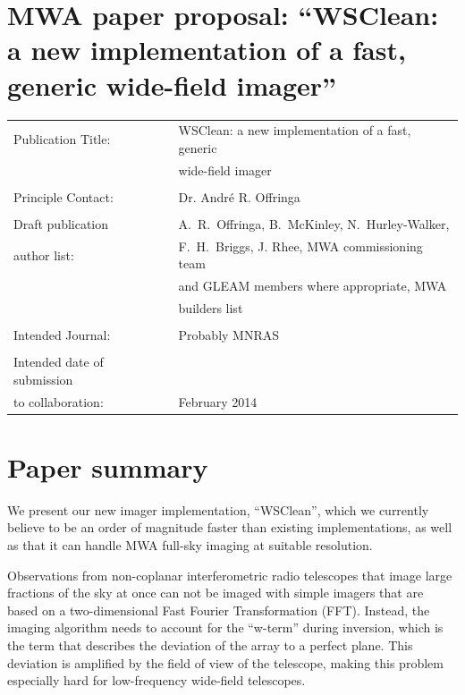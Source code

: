 \documentclass[a4paper,10pt]{article}
\begin{document}
\label{firstpage}
\section*{MWA paper proposal: ``WSClean: a new implementation of a fast, generic wide-field imager''}
\begin{tabular}{ll}
Publication Title: & WSClean: a new implementation of a fast, generic \\
                   & wide-field imager\\
                   & \\
Principle Contact: & Dr. Andr\'e R. Offringa \\
                   & \\
Draft publication        & A.~R.~Offringa, B.~McKinley, N.~Hurley-Walker, \\
\hspace{5mm}author list: & F.~H.~Briggs, J. Rhee, MWA commissioning team \\
                         & and GLEAM members where appropriate, MWA \\
                         & builders list \\
                   & \\
Intended Journal: & Probably MNRAS\\
                   & \\
Intended date of submission\\
\hspace{5mm}to collaboration: & February 2014\\
\end{tabular}

\section*{Paper summary}
We present our new imager implementation, ``WSClean'', which we currently believe to be an order of magnitude faster than existing implementations, as well as that it can handle MWA full-sky imaging at suitable resolution.

Observations from non-coplanar interferometric radio telescopes that image large fractions of the sky at once can not be imaged with simple imagers that are based on a two-dimensional Fast Fourier Transformation (FFT). Instead, the imaging algorithm needs to account for the ``w-term'' during inversion, which is the term that describes the deviation of the array to a perfect plane. This deviation is amplified by the field of view of the telescope, making this problem especially hard for low-frequency wide-field telescopes.
\end{document}
